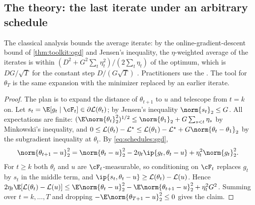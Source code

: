 \begin{refsection}
\section{The theory: the last iterate under an arbitrary schedule}\label{sec:schedules:convex}

The classical analysis bounds the average iterate: by the online-gradient-descent bound of \cref{thm:toolkit:ogd} and Jensen's inequality, the $\eta$-weighted average of the iterates is within $(D^2+G^2\sum_t\eta_t^2)/(2\sum_t\eta_t)$ of the optimum, which is $DG/\sqrt T$ for the constant step $D/(G\sqrt T)$ \parencite{NemirovskiEtAl2009}. Practitioners use the . The tool for $\theta_T$ is the same expansion with the minimizer replaced by an earlier iterate.


\begin{proof}
The plan is to expand the distance of $\theta_{t+1}$ to $u$ and telescope from $t=k$ on. Let $s_t=\E[g_t\mid\cF_t]\in\partial\Loss(\theta_t)$; by Jensen's inequality $\norm{s_t}_2\le G$. All expectations are finite: $(\E\norm{\theta_t}_2^2)^{1/2}\le\norm{\theta_1}_2+G\sum_{s<t}\eta_s$ by Minkowski's inequality, and $0\le\Loss(\theta_t)-\Loss^\star\le\Loss(\theta_1)-\Loss^\star+G\norm{\theta_t-\theta_1}_2$ by the subgradient inequality at $\theta_t$. By \eqref{eq:schedules:sgd},
\[
  \norm{\theta_{t+1}-u}_2^2=\norm{\theta_t-u}_2^2-2\eta_t\ip{g_t,\theta_t-u}+\eta_t^2\norm{g_t}_2^2 .
\]
For $t\ge k$ both $\theta_t$ and $u$ are $\cF_t$-measurable, so conditioning on $\cF_t$ replaces $g_t$ by $s_t$ in the middle term, and $\ip{s_t,\theta_t-u}\ge\Loss(\theta_t)-\Loss(u)$. Hence $2\eta_t\E[\Loss(\theta_t)-\Loss(u)]\le\E\norm{\theta_t-u}_2^2-\E\norm{\theta_{t+1}-u}_2^2+\eta_t^2G^2$. Summing over $t=k,\dots,T$ and dropping $-\E\norm{\theta_{T+1}-u}_2^2\le0$ gives the claim.
\end{proof}


\end{refsection}

